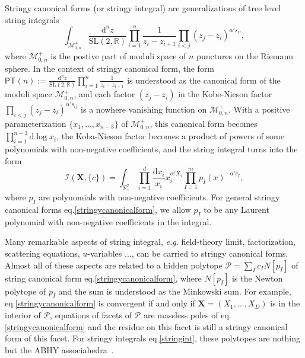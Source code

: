 \documentclass[hidelinks,12pt]{article}
\begin{document}
Stringy canonical forms (or stringy integral) are generalizations of tree level string integrals
\begin{equation}\label{stringint}
\int_{\mathcal M_{0,n}^+}
\frac{\mathrm d^{n}z}{\mathrm{SL}(2,\mathbb{R})} \prod_{i=1}^{n}\frac{1}{z_{i}-z_{i+1}}
\prod_{i<j}(z_j-z_i)^{\alpha' s_{ij}},
\end{equation}
where $\mathcal M_{0,n}^+$ is the postive part of moduli space of $n$ punctures on
the Riemann sphere.
In the context of stringy canonical form, the form $\mathsf{PT}(n):=\frac{\mathrm d^{n}z}{\mathrm{SL}(2,\mathbb{R})} \prod_{i=1}^{n}\frac{1}{z_{i}-z_{i+1}}$ is understood
as the canonical form of the moduli space $\mathcal M_{0,n}^+$, and each factor 
$(z_j-z_i)$ in the Kobe-Nieson factor $\prod_{i<j}(z_j-z_i)^{\alpha' s_{ij}}$ 
is a nowhere vanishing function on $\mathcal M_{0,n}^+$.
With a positive parameterization $\{x_1,\dots,x_{n-3}\}$ of $\mathcal M_{0,n}^+$, 
this canonical form becomes $\prod_{i=1}^{n-3}\mathrm d \log x_i$, 
the Koba-Nieson factor becomes a product of powers of some polynomials with 
non-negative coefficients, and the string integral turns into the form
\begin{equation}\label{stringycanonicalform}
	\mathcal I(\mathbf X,\{c\})=
	\int_{\mathbb R_+^d}\prod_{i=1}^d \frac{\mathrm d x_i}{x_i}x_i^{\alpha'X_i}
	\prod_{I=1}^m p_I(x)^{-\alpha' c_I},
\end{equation}
where $p_I$ are polynomials with non-negative coefficients. For general stringy
canonical forms eq.\eqref{stringycanonicalform}, we allow $p_I$ to be any Laurent 
polynomial with non-negative coefficients in the integral.

Many remarkable aspects of string integral, \textit{e.g.} field-theory limit, 
factorization, scattering equations, $u$-variables ..., can be carried to
stringy canonical forms. Almost all of these aspects are related to a hidden 
polytope $\mathcal P=\sum_I c_I N[p_I]$ of string canonical form 
eq.\eqref{stringycanonicalform}, where $N[p_I]$ is the Newton polytope of $p_I$ and 
the sum is understood as the Minkowski sum. For example, 
eq.\eqref{stringycanonicalform} is convergent if and only if 
$\mathbf X=(X_1,\dots,X_D)$ is in the interior of $\mathcal P$, equations of
facets of $\mathcal P$ are massless poles of eq.\eqref{stringycanonicalform}
and the residue on this facet is still a stringy canonical form of this facet.
For stringy integrals eq.\eqref{stringint}, these polytopes are nothing but the ABHY
associahedra~\cite{}.
\end{document}
